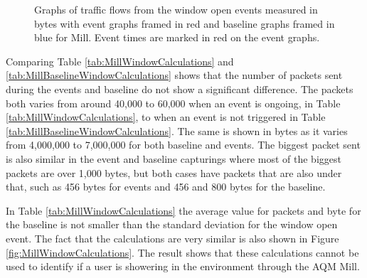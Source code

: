 \begin{figure}[H]
\begin{subfigure}[b]{0.47\textwidth}
        \centering
    \end{subfigure}
        \begin{subfigure}[b]{0.47\textwidth}
        \centering
    \end{subfigure}
    \begin{subfigure}[b]{0.47\textwidth}
        \centering
    \end{subfigure}
    \begin{subfigure}[b]{0.47\textwidth}
        \centering
    \end{subfigure}
    \hspace{0.6cm}
    \begin{subfigure}[b]{0.47\textwidth}
    \centering
        \end{subfigure}
    \caption{Graphs of traffic flows from the window open events measured in bytes with event graphs framed in red and baseline graphs framed in blue for Mill. Event times are marked in red on the event graphs.}  
    \label{fig:MillWindowBytes2}
\end{figure}

Comparing Table \ref{tab:MillWindowCalculations} and \ref{tab:MillBaselineWindowCalculations} shows that the number of packets sent during the events and baseline do not show a significant difference. The packets both varies from around 40,000 to 60,000 when an event is ongoing, in Table \ref{tab:MillWindowCalculations}, to when an event is not triggered in Table \ref{tab:MillBaselineWindowCalculations}. The same is shown in bytes as it varies from 4,000,000 to 7,000,000 for both baseline and events. The biggest packet sent is also similar in the event and baseline capturings where most of the biggest packets are over 1,000 bytes, but both cases have packets that are also under that, such as 456 bytes for events and 456 and 800 bytes for the baseline. 

In Table \ref{tab:MillWindowCalculations} the average value for packets and byte for the baseline is not smaller than the standard deviation for the window open event. The fact that the calculations are very similar is also shown in Figure \ref{fig:MillWindowCalculations}. The result shows that these calculations cannot be used to identify if a user is showering in the environment through the \gls{AQM} Mill. 

